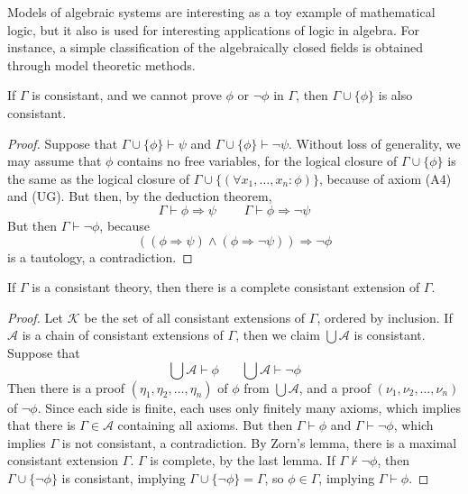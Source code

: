 Models of algebraic systems are interesting as a toy example of mathematical logic, but it also is used for interesting applications of logic in algebra. For instance, a simple classification of the algebraically closed fields is obtained through model theoretic methods.

\begin{theorem}
    If $\Gamma$ is consistant, and we cannot prove $\phi$ or $\neg \phi$ in $\Gamma$, then $\Gamma \cup \{ \phi \}$ is also consistant.
\end{theorem}
\begin{proof}
    Suppose that $\Gamma \cup \{ \phi \} \vdash \psi$ and $\Gamma \cup \{ \phi \} \vdash \neg \psi$. Without loss of generality, we may assume that $\phi$ contains no free variables, for the logical closure of $\Gamma \cup \{ \phi \}$ is the same as the logical closure of $\Gamma \cup \{ (\forall x_1, \dots, x_n: \phi) \}$, because of axiom (A4) and (UG). But then, by the deduction theorem,
    \[ \Gamma \vdash \phi \Rightarrow \psi\ \ \ \ \ \ \ \ \ \ \Gamma \vdash \phi \Rightarrow \neg \psi \]
    But then $\Gamma \vdash \neg \phi$, because
    \[ ((\phi \Rightarrow \psi) \wedge (\phi \Rightarrow \neg \psi)) \Rightarrow \neg \phi \]
    is a tautology, a contradiction.
\end{proof}

\begin{lemma}[Lindenbaum]
    If $\Gamma$ is a consistant theory, then there is a complete consistant extension of $\Gamma$.
\end{lemma}
\begin{proof}
    Let $\mathcal{K}$ be the set of all consistant extensions of $\Gamma$, ordered by inclusion. If $\mathcal{A}$ is a chain of consistant extensions of $\Gamma$, then we claim $\bigcup \mathcal{A}$ is consistant. Suppose that
    \[ \bigcup \mathcal{A} \vdash \phi\ \ \ \ \ \ \ \ \bigcup \mathcal{A} \vdash \neg \phi \]
    Then there is a proof $(\eta_1, \eta_2, \dots, \eta_n)$ of $\phi$ from $\bigcup \mathcal{A}$, and a proof $(\nu_1, \nu_2, \dots, \nu_n)$ of $\neg \phi$. Since each side is finite, each uses only finitely many axioms, which implies that there is $\Gamma \in \mathcal{A}$ containing all axioms. But then $\Gamma \vdash \phi$ and $\Gamma \vdash \neg \phi$, which implies $\Gamma$ is not consistant, a contradiction. By Zorn's lemma, there is a maximal consistant extension $\Gamma$. $\Gamma$ is complete, by the last lemma. If $\Gamma \not \vdash \neg \phi$, then $\Gamma \cup \{ \neg \phi \}$ is consistant, implying $\Gamma \cup \{ \neg \phi \} = \Gamma$, so $\phi \in \Gamma$, implying $\Gamma \vdash \phi$.
\end{proof}

